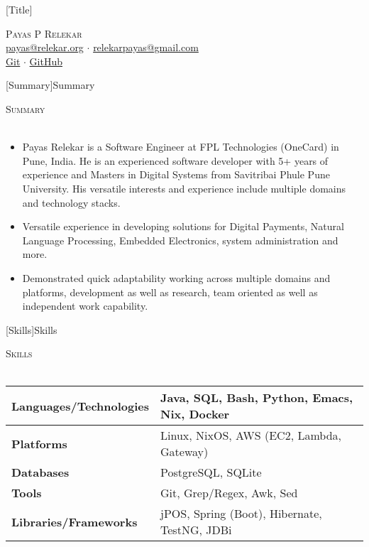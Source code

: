 \documentclass[a4paper]{article}
\newcommand{\lineunder} {
    \vspace*{-8pt} \\
    \hspace*{-18pt} \hrulefill \\
}
\newcommand{\header} [1] {
    {\hspace*{-18pt}\vspace*{6pt} \textsc{#1}}
    \vspace*{-6pt} \lineunder
}
\begin{document}
\vspace*{-40pt}

\vspace*{-10pt}
[Title]{}
\begin{center}
  {\Huge \scshape {Payas P Relekar}}\\
  \href{mailto:payas@relekar.org}{payas@relekar.org} $\cdot$ \href{mailto:relekarpayas@gmail.com}{relekarpayas@gmail.com} \\
  \href{https://git.bhankas.org/payas/}{Git} $\cdot$ \href{https://github.com/bhankas/}{GitHub}\\
\end{center}

[Summary]{Summary}
\header{Summary}
\vspace{1mm}

\begin{itemize} \itemsep 1pt
  \item Payas Relekar is a Software Engineer at FPL Technologies (OneCard) in Pune, India. He is an experienced software developer with 5+ years of experience and Masters in Digital Systems from Savitribai Phule Pune University. His versatile interests and experience include multiple domains and technology stacks.
  \item Versatile experience in developing solutions for Digital Payments, Natural Language Processing, Embedded Electronics, system administration and more.
  \item Demonstrated quick adaptability working across multiple domains and platforms, development as well as research, team oriented as well as independent work capability.
\end{itemize}

[Skills]{Skills}
\header{Skills}
\vspace{1mm}
\bgroup
\setlength{\arrayrulewidth}{0.2mm}
\def\arraystretch{1.2}
\begin{tabularx}{\textwidth}{ | X | X | }
  \hline
  \textbf{Languages/Technologies} & Java, SQL, Bash, Python, Emacs, Nix, Docker        \\
  \hline
  \textbf{Platforms}             & Linux, NixOS, AWS (EC2, Lambda, Gateway)          \\
  \hline
  \textbf{Databases}             & PostgreSQL, SQLite          \\
  \hline
  \textbf{Tools}                 & Git, Grep/Regex, Awk, Sed            \\
  \hline
  \textbf{Libraries/Frameworks}  & jPOS, Spring (Boot), Hibernate, TestNG, JDBi \\
  \hline
\end{tabularx}
\egroup
\vspace{2mm}
\end{document}
